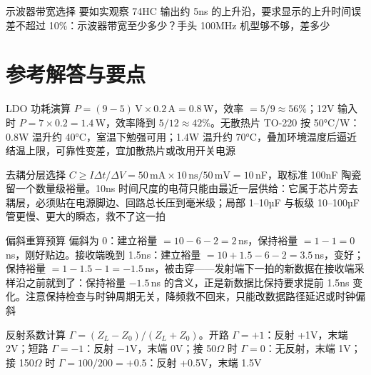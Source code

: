 \begin{chapterexercise}{示波器带宽选择}
要如实观察 74HC 输出约 5ns 的上升沿，要求显示的上升时间误差不超过 10\%：示波器带宽至少多少？手头 100MHz 机型够不够，差多少
\end{chapterexercise}

\section*{参考解答与要点}

\begin{chapteranswer}{LDO 功耗演算}
$P = (9-5)\,\mathrm{V} \times 0.2\,\mathrm{A} = 0.8$\,W，效率 $= 5/9 \approx 56\%$；12V 输入时 $P = 7 \times 0.2 = 1.4$\,W，效率降到 $5/12 \approx 42\%$。无散热片 TO-220 按 50°C/W：0.8W 温升约 40°C，室温下勉强可用；1.4W 温升约 70°C，叠加环境温度后逼近结温上限，可靠性变差，宜加散热片或改用开关电源
\end{chapteranswer}

\begin{chapteranswer}{去耦分层选择}
$C \geq I\Delta t/\Delta V = 50\,\mathrm{mA} \times 10\,\mathrm{ns} / 50\,\mathrm{mV} = 10$\,nF，取标准 100nF 陶瓷留一个数量级裕量。10ns 时间尺度的电荷只能由最近一层供给：它属于芯片旁去耦层，必须贴在电源脚边、回路总长压到毫米级；局部 1--10µF 与板级 10--100µF 管更慢、更大的瞬态，救不了这一拍
\end{chapteranswer}

\begin{chapteranswer}{偏斜重算预算}
偏斜为 0：建立裕量 $= 10-6-2 = 2$\,ns，保持裕量 $= 1-1 = 0$\,ns，刚好贴边。接收端晚到 1.5ns：建立裕量 $= 10+1.5-6-2 = 3.5$\,ns，变好；保持裕量 $= 1-1.5-1 = -1.5$\,ns，被击穿——发射端下一拍的新数据在接收端采样沿之前就到了：保持裕量 $-1.5$\,ns 的含义，正是新数据比保持要求提前 1.5ns 变化。注意保持检查与时钟周期无关，降频救不回来，只能改数据路径延迟或时钟偏斜
\end{chapteranswer}

\begin{chapteranswer}{反射系数计算}
$\Gamma = (Z_L - Z_0)/(Z_L + Z_0)$。开路 $\Gamma = +1$：反射 +1V，末端 2V；短路 $\Gamma = -1$：反射 $-1$V，末端 0V；接 50$\Omega$ 时 $\Gamma = 0$：无反射，末端 1V；接 150$\Omega$ 时 $\Gamma = 100/200 = +0.5$：反射 +0.5V，末端 1.5V
\end{chapteranswer}

